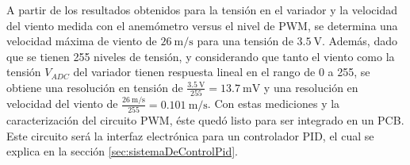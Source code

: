 \newpage
A partir de los resultados obtenidos para la tensión en el variador y la velocidad del viento medida con el anemómetro versus el nivel de PWM, se determina una velocidad máxima de viento de $\SI{26}{\meter\per\second}$ para una tensión de $\SI{3.5}{\volt}$. Además, dado que se tienen 255 niveles de tensión, y considerando que tanto el viento como la tensión $V_{ADC}$ del variador tienen respuesta lineal en el rango de 0 a 255, se obtiene una resolución en tensión de $\frac{\SI{3.5}{\volt}}{255} = \SI{13.7}{\milli\volt}$ y una resolución en velocidad del viento de $\frac{\SI{26}{\meter\per\second}}{255} = \SI{0.101}{\meter\per\second}$. Con estas mediciones y la caracterización del circuito PWM, éste quedó listo para ser integrado en un PCB. Este circuito será la interfaz electrónica para un controlador PID, el cual se explica en la sección \ref{sec:sistemaDeControlPid}.


